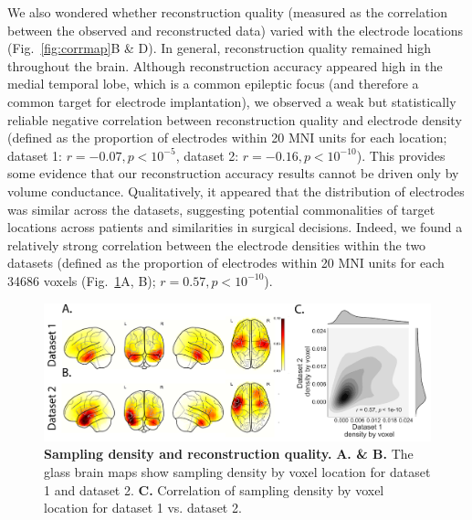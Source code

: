 \documentclass[12pt]{article}
\begin{document}
We also wondered whether reconstruction quality (measured as the
correlation between the observed and reconstructed data) varied with
the electrode locations (Fig.~\ref{fig:corrmap}B \& D). In general, reconstruction quality remained high throughout the brain. Although reconstruction accuracy appeared high in the medial temporal lobe, which is a common epileptic focus (and therefore a common target for electrode implantation), we observed a weak but statistically reliable negative correlation between reconstruction quality and electrode density (defined as the proportion of electrodes within 20 MNI units for each location; dataset 1: $r = -0.07, p < 10^{-5}$, dataset 2: $r = -0.16, p < 10^{-10}$). This provides some evidence that our reconstruction accuracy results cannot be driven only by volume conductance.  Qualitatively, it appeared that the distribution of electrodes was similar across the datasets, suggesting potential commonalities of target locations across patients and similarities in surgical decisions. Indeed, we found a relatively strong correlation between the electrode densities within the two datasets (defined as the proportion of electrodes within 20 MNI units for each 34686 voxels (Fig.~\ref{fig:density}A, B); $r = 0.57, p < 10^{-10}$).  



\begin{figure}
  \centering
  \includegraphics[width=\textwidth]{figs/density}
  \caption{\textbf{Sampling density and reconstruction quality.}
    \textbf{A. \& B. } The glass brain maps show sampling density by voxel location for dataset 1 and dataset 2. \textbf{C.}
      Correlation of sampling density by voxel location for dataset 1 vs. dataset 2.}
  \label{fig:density}
\end{figure}
\end{document}

